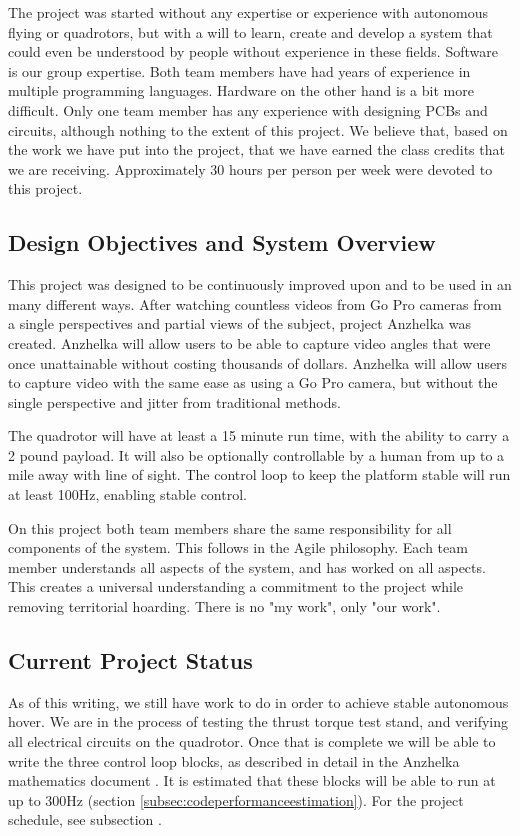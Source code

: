 \documentclass{article}
\numberwithin{equation}{section} %
\begin{document}
The project was started without any expertise or experience with autonomous flying or quadrotors, but with a will to learn, create and develop a system that could even be understood by people without experience in these fields. Software is our group expertise. Both team members have had years of experience in multiple programming languages. Hardware on the other hand is a bit more difficult. Only one team member has any experience with designing PCBs and circuits, although nothing to the extent of this project. We believe that, based on the work we have put into the project, that we have earned the class credits that we are receiving. Approximately 30 hours per person per week were devoted to this project.

\subsection{Design Objectives and System Overview}

This project was designed to be continuously improved upon and to be used in an many different ways. After watching countless videos from Go Pro cameras from a single perspectives and partial views of the subject, project Anzhelka was created. Anzhelka will allow users to be able to capture video angles that were once unattainable without costing thousands of dollars. Anzhelka will allow users to capture video with the same ease as using a Go Pro camera, but without the single perspective and jitter from traditional methods.

The quadrotor will have at least a 15 minute run time, with the ability to carry a 2 pound payload. It will also be optionally controllable by a human from up to a mile away with line of sight. The control loop to keep the platform stable will run at least 100Hz, enabling stable control.

On this project both team members share the same responsibility for all components of the system. This follows in the Agile philosophy. Each team member understands all aspects of the system, and has worked on all aspects. This creates a universal understanding a commitment to the project while removing territorial hoarding. There is no "my work", only "our work".

\subsection{Current Project Status}
As of this writing, we still have work to do in order to achieve stable autonomous hover. We are in the process of testing the thrust torque test stand, and verifying all electrical circuits on the quadrotor. Once that is complete we will be able to write the three control loop blocks, as described in detail in the Anzhelka mathematics document \cite{anzhelka_math}. It is estimated that these blocks will be able to run at up to 300Hz (section \ref{subsec:codeperformanceestimation}).  For the project schedule, see subsection \cite{maintenance_plan_10}.
\end{document}
